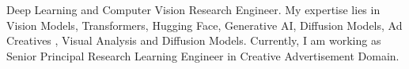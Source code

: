\par{
	Deep  Learning and Computer Vision Research Engineer.
	My expertise lies in Vision Models, Transformers, Hugging Face, Generative AI, Diffusion Models, Ad Creatives , Visual Analysis and Diffusion Models.
	 Currently, I am working as Senior Principal Research Learning Engineer in Creative Advertisement Domain. 
}